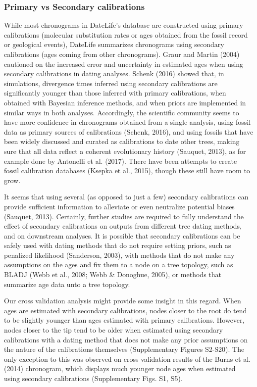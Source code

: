 \documentclass[english,man]{apa6}
\begin{document}
\hypertarget{primary-vs-secondary-calibrations}{%
\subsubsection{Primary vs Secondary calibrations}\label{primary-vs-secondary-calibrations}}

While most chronograms in DateLife's database are constructed using primary calibrations (molecular substitution rates or ages obtained from the fossil record or geological events), DateLife summarizes chronograms using secondary calibrations (ages coming from other chronograms).
Graur and Martin (2004) cautioned on the increased error and uncertainty in estimated ages when using secondary calibrations in dating analyses.
Schenk (2016) showed that, in simulations, divergence times inferred using secondary calibrations are significantly younger than those inferred with primary calibrations, when obtained with Bayesian inference methods, and when priors are implemented in similar ways in both analyses.
Accordingly, the scientific community seems to have more confidence in chronograms obtained from a single analysis, using fossil data as primary sources of calibrations (Schenk, 2016), and using fossils that have been widely discussed and curated as calibrations to date other trees, making sure that all data reflect a coherent evolutionary history (Sauquet, 2013), as for example done by Antonelli et al. (2017).
There have been attempts to create fossil calibration databases (Ksepka et al., 2015), though these still have room to grow.

It seems that using several (as opposed to just a few) secondary calibrations can provide sufficient information to alleviate or even neutralize potential biases (Sauquet, 2013).
Certainly, further studies are required to fully understand the effect of secondary calibrations on outputs from different tree dating methods, and on downstream analyses. It is possible that secondary calibrations can be safely used with dating methods that do not require setting priors, such as penalized likelihood (Sanderson, 2003), with methods that do not make any assumptions on the ages and fix them to a node on a tree topology, such as BLADJ (Webb et al., 2008; Webb \& Donoghue, 2005), or methods that summarize age data unto a tree topology.

Our cross validation analysis might provide some insight in this regard. When ages are estimated with secondary calibrations, nodes closer to the root do tend to be slightly younger than ages estimated with primary calibrations. However, nodes closer to the tip tend to be older when estimated using secondary calibrations with a dating method that does not make any prior assumptions on the nature of the calibrations themselves (Supplementary Figures S2-S20). The only exception to this was observed on cross validation results of the Burns et al. (2014) chronogram, which displays much younger node ages when estimated using secondary calibrations (Supplementary Figs. S1, S5).
\end{document}
